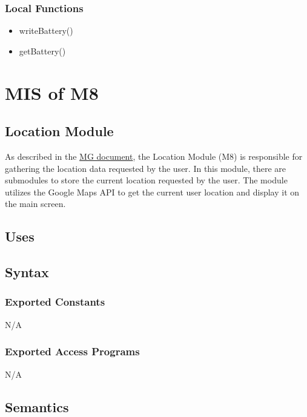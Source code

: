\documentclass[12pt, titlepage]{article}
\begin{document}
\subsubsection{Local Functions}

\begin{itemize}
\item writeBattery()
\item getBattery()
\end{itemize}

\section{MIS of M8} \label{Location} 

\subsection{Location Module}

As described in the \href{https://github.com/NevoAbigail/Capstone/blob/main/docs/Design/SoftArchitecture/MG.pdf}{MG document}, the Location Module (M8) is responsible for gathering the location data requested by the user. In this module, there are submodules to store the current location requested by the user. The module utilizes the Google Maps API to get the current user location and display it on the main screen. 

\subsection{Uses}


\subsection{Syntax}

\subsubsection{Exported Constants}

N/A

\subsubsection{Exported Access Programs}

N/A

\subsection{Semantics}
\end{document}
